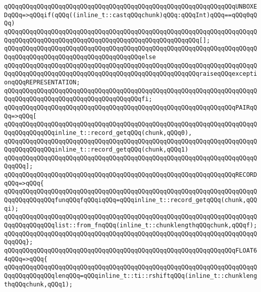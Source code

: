 \verb|qQQqqQQqqQQqqQQqqQQqqQQqqQQqqQQqqQQqqQQqqQQqqQQqqQQqqQQqqQQqqQQqUNBOXEDqQQq=>qQQqif(qQQq((inline_t::castqQQqchunk)qQQq:qQQqInt)qQQq==qQQq0qQQq)|\newline
\verb|qQQqqQQqqQQqqQQqqQQqqQQqqQQqqQQqqQQqqQQqqQQqqQQqqQQqqQQqqQQqqQQqqQQqqQQqqQQqqQQqqQQqqQQqqQQqqQQqqQQqqQQqqQQqqQQqqQQqqQQqqQQq[];|\newline
\verb|qQQqqQQqqQQqqQQqqQQqqQQqqQQqqQQqqQQqqQQqqQQqqQQqqQQqqQQqqQQqqQQqqQQqqQQqqQQqqQQqqQQqqQQqqQQqqQQqqQQqqQQqqQQqelse|\newline
\verb|qQQqqQQqqQQqqQQqqQQqqQQqqQQqqQQqqQQqqQQqqQQqqQQqqQQqqQQqqQQqqQQqqQQqqQQqqQQqqQQqqQQqqQQqqQQqqQQqqQQqqQQqqQQqqQQqqQQqqQQqqQQqraiseqQQqexceptionqQQqREPRESENTATION;|\newline
\verb|qQQqqQQqqQQqqQQqqQQqqQQqqQQqqQQqqQQqqQQqqQQqqQQqqQQqqQQqqQQqqQQqqQQqqQQqqQQqqQQqqQQqqQQqqQQqqQQqqQQqqQQqqQQqfi;|\newline
\newline
\verb|qQQqqQQqqQQqqQQqqQQqqQQqqQQqqQQqqQQqqQQqqQQqqQQqqQQqqQQqqQQqqQQqPAIRqQQq=>qQQq[|\newline
\verb|qQQqqQQqqQQqqQQqqQQqqQQqqQQqqQQqqQQqqQQqqQQqqQQqqQQqqQQqqQQqqQQqqQQqqQQqqQQqqQQqqQQqinline_t::record_getqQQq(chunk,qQQq0),|\newline
\verb|qQQqqQQqqQQqqQQqqQQqqQQqqQQqqQQqqQQqqQQqqQQqqQQqqQQqqQQqqQQqqQQqqQQqqQQqqQQqqQQqqQQqinline_t::record_getqQQq(chunk,qQQq1)|\newline
\verb|qQQqqQQqqQQqqQQqqQQqqQQqqQQqqQQqqQQqqQQqqQQqqQQqqQQqqQQqqQQqqQQqqQQqqQQqqQQq];|\newline
\newline
\verb|qQQqqQQqqQQqqQQqqQQqqQQqqQQqqQQqqQQqqQQqqQQqqQQqqQQqqQQqqQQqqQQqRECORDqQQq=>qQQq{|\newline
\verb|qQQqqQQqqQQqqQQqqQQqqQQqqQQqqQQqqQQqqQQqqQQqqQQqqQQqqQQqqQQqqQQqqQQqqQQqqQQqqQQqqQQqfunqQQqfqQQqiqQQq=qQQqinline_t::record_getqQQq(chunk,qQQqi);|\newline
\newline
\verb|qQQqqQQqqQQqqQQqqQQqqQQqqQQqqQQqqQQqqQQqqQQqqQQqqQQqqQQqqQQqqQQqqQQqqQQqqQQqqQQqqQQqlist::from_fnqQQq(inline_t::chunklengthqQQqchunk,qQQqf);|\newline
\verb|qQQqqQQqqQQqqQQqqQQqqQQqqQQqqQQqqQQqqQQqqQQqqQQqqQQqqQQqqQQqqQQqqQQqqQQqqQQq};|\newline
\newline
\verb|qQQqqQQqqQQqqQQqqQQqqQQqqQQqqQQqqQQqqQQqqQQqqQQqqQQqqQQqqQQqqQQqFLOAT64qQQq=>qQQq{|\newline
\verb|qQQqqQQqqQQqqQQqqQQqqQQqqQQqqQQqqQQqqQQqqQQqqQQqqQQqqQQqqQQqqQQqqQQqqQQqqQQqqQQqqQQqlenqQQq=qQQqinline_t::ti::rshiftqQQq(inline_t::chunklengthqQQqchunk,qQQq1);|\newline
